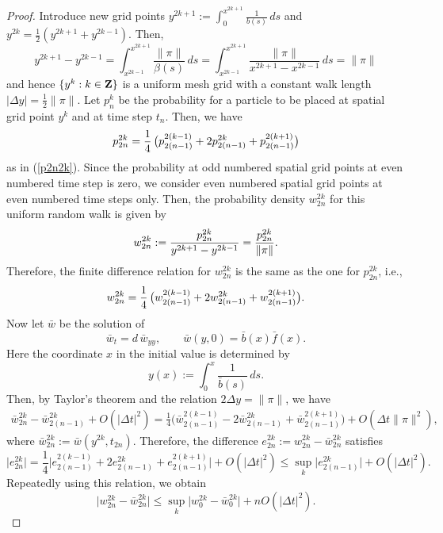 \documentclass[11pt]{amsart}
\def\Z{\mathbb{Z}}
\def\d{d}
\def\Z{{\bf Z}}
\begin{document}
\begin{proof}
Introduce new grid points $y^{2k+1}:=\int_0^{x^{2k+1}} \frac{1}{b(s)}\,ds$ and $y^{2k}=\frac{1}{2}(y^{2k+1}+y^{2k-1})$. Then,
\[
y^{2k+1}-y^{2k-1} =\int_{x^{2k-1}}^{x^{2k+1}}\frac{\|\pi\|}{\beta(s)}\,ds =\int_{x^{2k-1}}^{x^{2k+1}}\frac{\|\pi\|}{x^{2k+1}-x^{2k-1}}\,ds  =\|\pi\|
\]
and hence $\{y^k:k\in\Z\}$ is a uniform mesh grid with a constant walk length $|\Delta y|=\frac{1}{2}\|\pi\|$. Let $p_n^k$ be the probability for a particle to be placed at spatial grid point $y^k$ and at time step $t_n$. Then, we have
\[
p^{2k}_{2n} ={1\over 4}\, \big( p^{2(k-1)}_{2(n-1)} +2p^{2k}_{2(n-1)} +p^{2(k+1)}_{2(n-1)} \big)
\]
as in (\ref{p2n2k}). Since the probability at odd numbered spatial grid points at even numbered time step is zero, we consider even numbered spatial grid points at even numbered time steps only. Then, the probability density $w^{2k}_{2n}$ for this uniform random walk is given by
\[
w^{2k}_{2n}:={p^{2k}_{2n}\over y^{2k+1}-y^{2k-1}} = \frac{p^{2k}_{2n}}{ \|\pi\| }.
\]
Therefore, the finite difference relation for $w^{2k}_{2n}$ is the same as the one for $p^{2k}_{2n}$, i.e.,
\[
w^{2k}_{2n} ={1\over 4}\, \big( w^{2(k-1)}_{2(n-1)} +2w^{2k}_{2(n-1)} +w^{2(k+1)}_{2(n-1)} \big).
\]
Now let $\bar w$ be the solution of
\begin{equation} \label{barw}
\bar w_t =\d\,\bar w_{yy},\qquad\bar w(y,0) =\bar b(x)\bar f(x).
\end{equation}
Here the coordinate $x$ in the initial value is determined by
\begin{equation} \label{relation-y(x)}
y(x):=\int_0^x \frac{1}{\bar b(s)}\,ds.
\end{equation}
Then, by Taylor's theorem and the relation $2\Delta y=\|\pi\|$, we have
\[\begin{split}
\bar{w}^{2k}_{2n} -\bar{w}^{2k}_{2(n-1)} +O(|\Delta t|^2)
=\frac{1}{4} \big( \bar{w}^{2(k-1)}_{2(n-1)} -2\bar{w}^{2k}_{2(n-1)} + \bar{w}^{2(k+1)}_{2(n-1)} \big) +O(\Delta t\|\pi\|^{2}),
\end{split}\]
where $\bar{w}^{2k}_{2n}:=\bar{w}(y^{2k},t_{2n})$. Therefore, the difference $e^{2k}_{2n}:=w^{2k}_{2n}-\bar{w}^{2k}_{2n}$ satisfies
\[
\big| e^{2k}_{2n} \big| = \frac{1}{4} \big| e^{2(k-1)}_{2(n-1)} +2e^{2k}_{2(n-1)} +e^{2(k+1)}_{2(n-1)} \big| +O(|\Delta t|^2)\leq \sup_k \big| e^{2k}_{2(n-1)} \big| + O(|\Delta t|^2).
\]
Repeatedly using this relation, we obtain
\begin{equation} \label{error-between-w's}
\big| w^{2k}_{2n}-\bar{w}^{2k}_{2n} \big| \leq \sup_k \big| w^{2k}_0-\bar{w}^{2k}_0 \big| + nO(|\Delta t|^2).
\end{equation}


\end{proof}
\end{document}
